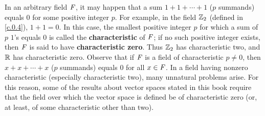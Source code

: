\begin{defn}\label{c.0.9}
  In an arbitrary field \(\mathit{F}\), it may happen that a sum \(1 + 1 + \cdots + 1\) (\(p\) summands) equals \(0\) for some positive integer \(p\).
  For example, in the field \(\mathbb{Z}_2\) (defined in \cref{c.0.4}), \(1 + 1 = 0\).
  In this case, the smallest positive integer \(p\) for which a sum of \(p\) \(1\)'s equals \(0\) is called the \textbf{characteristic} of \(\mathit{F}\);
  if no such positive integer exists, then \(\mathit{F}\) is said to have \textbf{characteristic zero}.
  Thus \(\mathbb{Z}_2\) has characteristic two, and \(\mathbb{R}\) has characteristic zero.
  Observe that if \(\mathit{F}\) is a field of characteristic \(p \neq 0\), then \(x + x + \cdots + x\) (\(p\) summands) equals \(0\) for all \(x \in \mathit{F}\).
  In a field having nonzero characteristic (especially characteristic two), many unnatural problems arise.
  For this reason, some of the results about vector spaces stated in this book require that the field over which the vector space is defined be of characteristic zero (or, at least, of some characteristic other than two).
\end{defn}

